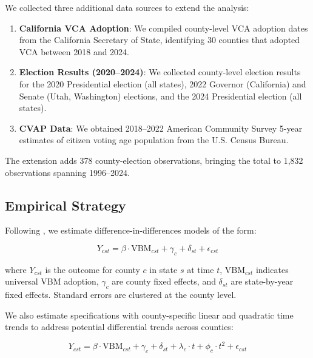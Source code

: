 \documentclass[12pt]{article}
\begin{document}
We collected three additional data sources to extend the analysis:

\begin{enumerate}
    \item \textbf{California VCA Adoption}: We compiled county-level VCA adoption dates from the California Secretary of State, identifying 30 counties that adopted VCA between 2018 and 2024.

    \item \textbf{Election Results (2020--2024)}: We collected county-level election results for the 2020 Presidential election (all states), 2022 Governor (California) and Senate (Utah, Washington) elections, and the 2024 Presidential election (all states).

    \item \textbf{CVAP Data}: We obtained 2018--2022 American Community Survey 5-year estimates of citizen voting age population from the U.S. Census Bureau.
\end{enumerate}

The extension adds 378 county-election observations, bringing the total to 1,832 observations spanning 1996--2024.

\subsection{Empirical Strategy}

Following \citet{thompson2020universal}, we estimate difference-in-differences models of the form:

\begin{equation}
Y_{cst} = \beta \cdot \text{VBM}_{cst} + \gamma_c + \delta_{st} + \epsilon_{cst}
\end{equation}

\noindent where $Y_{cst}$ is the outcome for county $c$ in state $s$ at time $t$, $\text{VBM}_{cst}$ indicates universal VBM adoption, $\gamma_c$ are county fixed effects, and $\delta_{st}$ are state-by-year fixed effects. Standard errors are clustered at the county level.

We also estimate specifications with county-specific linear and quadratic time trends to address potential differential trends across counties:

\begin{equation}
Y_{cst} = \beta \cdot \text{VBM}_{cst} + \gamma_c + \delta_{st} + \lambda_c \cdot t + \phi_c \cdot t^2 + \epsilon_{cst}
\end{equation}
\end{document}

